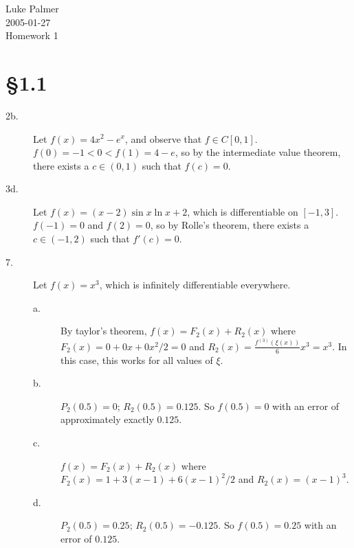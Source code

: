 \documentclass[12pt]{article}
\begin{document}
\noindent 
Luke Palmer \\
2005-01-27 \\
Homework 1

\section*{\S1.1}

\begin{description}
\item[2b.] Let $f(x) = 4x^2 - e^x$, and observe that $f \in C[0,1]$.
$f(0) = -1 < 0 < f(1) = 4-e$, so by the intermediate value theorem,
there exists a $c \in (0,1)$ such that $f(c) = 0$.

\item[3d.] Let $f(x) = (x-2) \sin{x} \ln{x+2}$, which is differentiable
on $[-1,3]$.  $f(-1) = 0$ and $f(2) = 0$, so by Rolle's theorem, there
exists a $c \in (-1,2)$ such that $f'(c) = 0$.

\item[7.] Let $f(x) = x^3$, which is infinitely differentiable
everywhere.
  \begin{description}
  \item[a.] By taylor's theorem, $f(x) = F_2(x) + R_2(x)$ where
            $F_2(x) = 0 + 0x + 0x^2/2 = 0$ and 
            $R_2(x) = \frac{f^{(3)}(\xi(x))}{6} x^3 = x^3$.  In this
            case, this works for all values of $\xi$.
  \item[b.] $P_2(0.5) = 0$; $R_2(0.5) = 0.125$.  So $f(0.5) = 0$ with an
            error of approximately exactly $0.125$.
  \item[c.] $f(x) = F_2(x) + R_2(x)$ where $F_2(x) = 1 + 3(x-1) + 6(x-1)^2/2$
            and $R_2(x) = (x-1)^3$.
  \item[d.] $P_2(0.5) = 0.25$; $R_2(0.5) = -0.125$.  So $f(0.5) = 0.25$
            with an error of $0.125$.
  \end{description}
\end{description}
\end{document}
